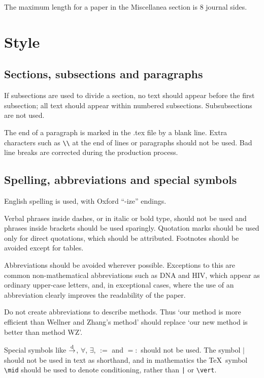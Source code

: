\documentclass[supplementary,lineno]{biometrika}
\begin{document}
The maximum length for a paper in the Miscellanea section is 8 journal sides.

\section{Style}

\subsection{Sections, subsections and paragraphs}

If subsections are used to divide a section, no text should appear before the first subsection; all text should appear within numbered subsections.  Subsubsections are not used.

The end of a paragraph is marked in the .tex file by a blank line.  Extra characters such as \verb+\\+ at the end of lines or paragraphs should not be used.  Bad line breaks are corrected during the production process.

\subsection{Spelling, abbreviations and special symbols}

English spelling is used, with Oxford ``-ize'' endings.

Verbal phrases inside dashes, or in italic or bold type, should not be used  and phrases inside brackets should be used sparingly. Quotation marks should be used only for direct quotations, which should be attributed. Footnotes should be avoided except for tables.

Abbreviations should be avoided wherever possible.  Exceptions to this are common non-mathematical abbreviations such as DNA and HIV, which appear as ordinary upper-case letters, and, in exceptional cases, where the use of an abbreviation clearly improves the readability of the paper.

Do not create abbreviations to describe methods. Thus `our method is more efficient than Wellner and Zhang's method' should replace `our new method is better than method WZ'.

Special symbols like $\mathop{\rightarrow}\limits^{\rm d}$, $\forall$, $\exists$, $:=$ and $=:$  should not be used.  The symbol $\mid$ should not be used in text as shorthand, and in mathematics the \TeX\ symbol \verb+\mid+ should be used to denote conditioning, rather than \verb+|+ or \verb"\vert".
\end{document}
